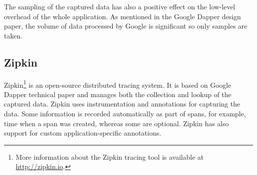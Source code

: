The sampling of the captured data has also a positive effect on the low-level overhead of the whole application. As mentioned in the Google Dapper design paper, the volume of data processed by Google is significant so only samples are taken.

\subsection{Zipkin}
\label{zipkin}
Zipkin\footnote{More information about the Zipkin tracing tool is available at \url{http://zipkin.io}.} is an open-source distributed tracing system. It is based on Google Dapper technical paper and manages both the collection and lookup of the captured data. Zipkin uses instrumentation and annotations for capturing the data. Some
information is recorded automatically as part of spans, for example, time when a span was created, whereas some are optional. Zipkin has also support for custom application-specific annotations.

